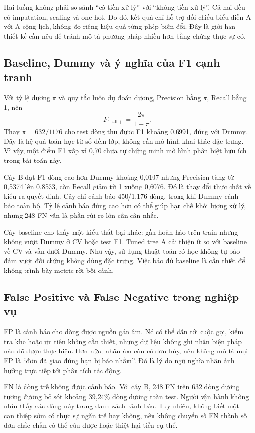 Hai luồng không phải so sánh ``có tiền xử lý'' với ``không tiền xử lý''.
Cả hai đều có imputation, scaling và one-hot. Do đó, kết quả chỉ hỗ trợ
đối chiếu biểu diễn A với A cộng lịch, không đo riêng hiệu quả từng phép
biến đổi. Đây là giới hạn thiết kế cần nêu để tránh mô tả phương pháp
nhiều hơn bằng chứng thực sự có.

\subsection{Baseline, Dummy và ý nghĩa của F1 cạnh tranh}
Với tỷ lệ dương $\pi$ và quy tắc luôn dự đoán dương, Precision bằng $\pi$,
Recall bằng 1, nên
\begin{equation}
F_{1,\mathrm{all+}}=\frac{2\pi}{1+\pi}.
\end{equation}
Thay $\pi=632/1176$ cho test dòng thu được F1 khoảng 0,6991, đúng với
Dummy. Đây là hệ quả toán học từ số đếm lớp, không cần mô hình khai thác
đặc trưng. Vì vậy, một điểm F1 xấp xỉ 0,70 chưa tự chứng minh mô hình
phân biệt hữu ích trong bài toán này.

Cây B đạt F1 dòng cao hơn Dummy khoảng 0,0107 nhưng Precision tăng từ
0,5374 lên 0,8533, còn Recall giảm từ 1 xuống 0,6076. Đó là thay đổi
thực chất về kiểu ra quyết định. Cây chỉ cảnh báo 450/1.176 dòng, trong
khi Dummy cảnh báo toàn bộ. Tỷ lệ cảnh báo đúng cao hơn có thể giúp hạn
chế khối lượng xử lý, nhưng 248 FN vẫn là phần rủi ro lớn cần cân nhắc.

Cây baseline cho thấy một kiểu thất bại khác: gần hoàn hảo trên train
nhưng không vượt Dummy ở CV hoặc test F1. Tuned tree A cải thiện ít so
với baseline về CV và vẫn dưới Dummy. Như vậy, sử dụng thuật toán có học
không tự bảo đảm vượt đối chứng không dùng đặc trưng. Việc báo đủ baseline
là cần thiết để không trình bày metric rời bối cảnh.

\subsection{False Positive và False Negative trong nghiệp vụ}
FP là cảnh báo cho dòng được nguồn gán âm. Nó có thể dẫn tới cuộc gọi,
kiểm tra kho hoặc ưu tiên không cần thiết, nhưng dữ liệu không ghi nhận
biện pháp nào đã được thực hiện. Hơn nữa, nhãn âm còn có đơn hủy, nên
không mô tả mọi FP là ``đơn đã giao đúng hạn bị báo nhầm''. Đó là lý do
ngữ nghĩa nhãn ảnh hưởng trực tiếp tới phân tích tác động.

FN là dòng trễ không được cảnh báo. Với cây B, 248 FN trên 632 dòng dương
tương đương bỏ sót khoảng 39,24\% dòng dương toàn test. Người vận hành
không nhìn thấy các dòng này trong danh sách cảnh báo. Tuy nhiên, không
biết một can thiệp sớm có thực sự ngăn trễ hay không, nên không chuyển
số FN thành số đơn chắc chắn có thể cứu được hoặc thiệt hại tiền cụ thể.


